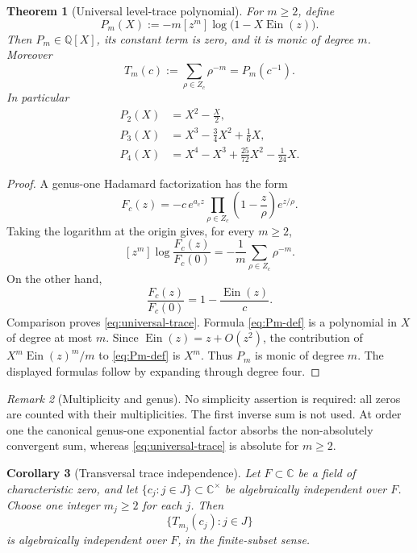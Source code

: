 \documentclass[11pt]{article}
\newtheorem{theorem}{Theorem}[section]
\newtheorem{corollary}[theorem]{Corollary}
\theoremstyle{definition}
\theoremstyle{remark}
\newtheorem{remark}[theorem]{Remark}
\newcommand{\Q}{\mathbb Q}
\newcommand{\C}{\mathbb C}
\newcommand{\Ein}{\operatorname{Ein}}
\begin{document}
\begin{theorem}[Universal level-trace polynomial]
\label{thm:universal-trace}
For \(m\ge2\), define
\begin{equation}\label{eq:Pm-def}
 P_m(X):=-m[z^m]\log\bigl(1-X\Ein(z)\bigr).
\end{equation}
Then \(P_m\in\Q[X]\), its constant term is zero, and it is monic of degree
\(m\).  Moreover
\begin{equation}\label{eq:universal-trace}
 \boxed{\displaystyle
 T_m(c):=\sum_{\rho\in Z_c}\rho^{-m}=P_m(c^{-1}).}
\end{equation}
In particular
\begin{align}
 P_2(X)&=X^2-\frac X2,\label{eq:P2}\\
 P_3(X)&=X^3-\frac34X^2+\frac16X,\label{eq:P3}\\
 P_4(X)&=X^4-X^3+\frac{25}{72}X^2-\frac1{24}X.\label{eq:P4}
\end{align}
\end{theorem}

\begin{proof}
A genus-one Hadamard factorization has the form
\[
 F_c(z)=-c\,e^{a_cz}
 \prod_{\rho\in Z_c}
 \left(1-\frac z\rho\right)e^{z/\rho}.
\]
Taking the logarithm at the origin gives, for every \(m\ge2\),
\[
 [z^m]\log\frac{F_c(z)}{F_c(0)}
 =-\frac1m\sum_{\rho\in Z_c}\rho^{-m}.
\]
On the other hand,
\[
 \frac{F_c(z)}{F_c(0)}=1-\frac{\Ein(z)}c.
\]
Comparison proves \eqref{eq:universal-trace}.  Formula
\eqref{eq:Pm-def} is a polynomial in \(X\) of degree at most \(m\).  Since
\(\Ein(z)=z+O(z^2)\), the contribution of
\(X^m\Ein(z)^m/m\) to \eqref{eq:Pm-def} is \(X^m\).  Thus \(P_m\) is monic
of degree \(m\).  The displayed formulas follow by expanding through degree
four.
\end{proof}

\begin{remark}[Multiplicity and genus]
No simplicity assertion is required: all zeros are counted with their
multiplicities.  The first inverse sum is not used.  At order one the
canonical genus-one exponential factor absorbs the non-absolutely convergent
sum, whereas \eqref{eq:universal-trace} is absolute for \(m\ge2\).
\end{remark}

\begin{corollary}[Transversal trace independence]
\label{cor:transversal}
Let \(F\subset\C\) be a field of characteristic zero, and let
\(\{c_j:j\in J\}\subset\C^\times\) be algebraically independent over \(F\).
Choose one integer \(m_j\ge2\) for each \(j\).  Then
\[
 \{T_{m_j}(c_j):j\in J\}
\]
is algebraically independent over \(F\), in the finite-subset sense.
\end{corollary}
\end{document}
